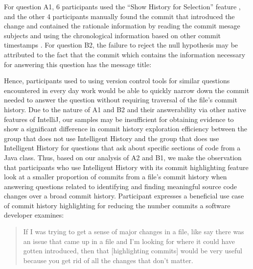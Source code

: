 For question A1, 6 participants used the ``Show History for Selection'' feature ,
and the other 4 participants manually found the commit that introduced the change and contained the rationale information by reading the commit mesage subjects and using the chronological information based on other commit timestamps .
For question B2, the failure to reject the null hypothesis may be attributed to the fact that the commit  which contains the information necessary for answering this question has the message title: 

\begin{center}
\end{center}

Hence, participants used to using version control tools for similar questions encountered in every day work would be able to quickly narrow down the commit needed to answer the question without requiring traversal of the file's commit history.
Due to the nature of A1 and B2 and their answerability via other native features of IntelliJ, our samples may be insufficient for obtaining evidence to show a significant difference in commit history exploration efficiency between the group that does not use Intelligent History and the group that does use Intelligent History for questions that ask about specific sections of code from a Java class.
Thus, based on our analysis of A2 and B1, we make the observation that participants who use Intelligent History with its commit highlighting feature look at a smaller proportion of commits from a file's commit history when answering questions related to
identifying and finding meaningful source code changes over a broad commit history.
Participant  expresses a beneficial use case of commit history highlighting for reducing the number commits a software developer examines:

\begin{quote}
  If I was trying to get a sense of major changes in a file, like say there was an issue that came up in a file and I’m looking for where it could have gotten introduced, 
  then that [highlighting commits] would be very useful because you get rid of all the changes that don’t matter. 
\end{quote}


